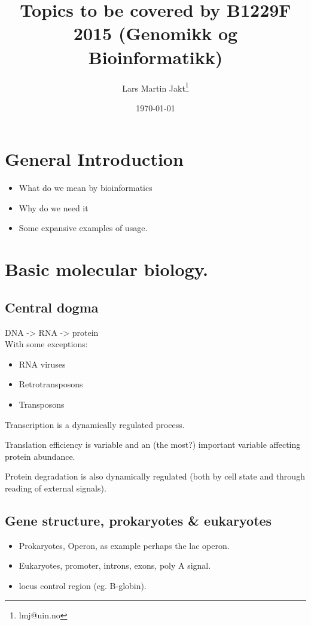 \documentclass{scrartcl}
\title{Topics to be covered by B1229F 2015 (Genomikk og Bioinformatikk)}
\author{Lars Martin Jakt\thanks{lmj@uin.no}}
\date{\today}
\begin{document}
\maketitle

\setcounter{tocdepth}{3}
\tableofcontents
\vspace*{1cm}




\section{General Introduction}
\label{sec-1}

\begin{itemize}
\item What do we mean by bioinformatics
\item Why do we need it
\item Some expansive examples of usage.
\end{itemize}
\section{Basic molecular biology.}
\label{sec-2}
\subsection{Central dogma}
\label{sec-2-1}

DNA -> RNA -> protein\\
With some exceptions:
\begin{itemize}
\item RNA viruses
\item Retrotransposons
\item Transposons
\end{itemize}
Transcription is a dynamically regulated process.

Translation efficiency is variable and an (the most?)
important variable affecting protein abundance.

Protein degradation is also dynamically regulated (both by cell
state and through reading of external signals).
\subsection{Gene structure, prokaryotes \& eukaryotes}
\label{sec-2-2}

\begin{itemize}
\item Prokaryotes, Operon, as example perhaps the lac operon.
\item Eukaryotes, promoter, introns, exons, poly A signal.
\item locus control region (eg. B-globin).
\end{itemize}
\end{document}
